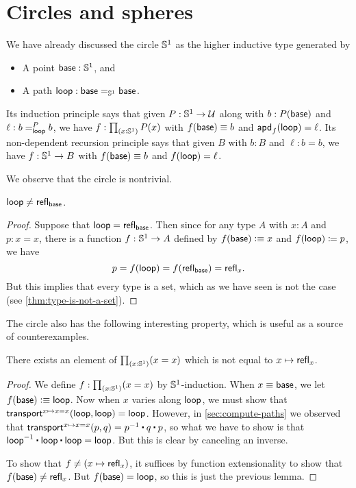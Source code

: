 \section{Circles and spheres}
\label{sec:circle}

We have already discussed the circle $\Sn^1$ as the higher inductive type generated by
\begin{itemize}
\item A point $\base:\Sn^1$, and
\item A path $\lloop : {\id[\Sn^1]\base\base}$.
\end{itemize}
Its induction principle says that given $P:\Sn^1\to\type$ along with $b:P(\base)$ and $\ell :\dpath P \lloop b b$, we have $f:\prd{x:\Sn^1} P(x)$ with $f(\base)\jdeq b$ and $\apd f \lloop = \ell$.
Its non-dependent recursion principle says that given $B$ with $b:B$ and $\ell:b=b$, we have $f:\Sn^1\to B$ with $f(\base)\jdeq b$ and $\ap f \lloop = \ell$.

We observe that the circle is nontrivial.

\begin{lem}\label{thm:loop-nontrivial}
  $\lloop\neq\refl{\base}$.
\end{lem}
\begin{proof}
  Suppose that $\lloop=\refl{\base}$.
  Then since for any type $A$ with $x:A$ and $p:x=x$, there is a function $f:\Sn^1\to A$ defined by $f(\base)\defeq x$ and $\ap f \lloop \defid p$, we have
  \[p = f(\lloop) = f(\refl{\base}) = \refl{x}.\]
  But this implies that every type is a set, which as we have seen is not the case (see \autoref{thm:type-is-not-a-set}).
\end{proof}

The circle also has the following interesting property, which is useful as a source of counterexamples.

\begin{lem}\label{thm:S1-autohtpy}
  There exists an element of $\prd{x:\Sn^1} (x=x)$ which is not equal to $x\mapsto \refl{x}$.
\end{lem}
\begin{proof}
  We define $f:\prd{x:\Sn^1} (x=x)$ by $\Sn^1$-induction.
  When $x\jdeq \base$, we let $f(\base)\defeq \lloop$.
  Now when $x$ varies along $\lloop$, we must show that $\transfib{x\mapsto x=x}{\lloop}{\lloop} = \lloop$.
  However, in \autoref{sec:compute-paths} we observed that $\transfib{x\mapsto x=x}{p}{q} = \opp{p} \ct q \ct p$, so what we have to show is that $\opp{\lloop} \ct \lloop \ct \lloop = \lloop$.
  But this is clear by canceling an inverse.

  To show that $f\neq (x\mapsto \refl{x})$, it suffices by function extensionality to show that $f(\base) \neq \refl{x}$.
  But $f(\base)=\lloop$, so this is just the previous lemma.
\end{proof}

